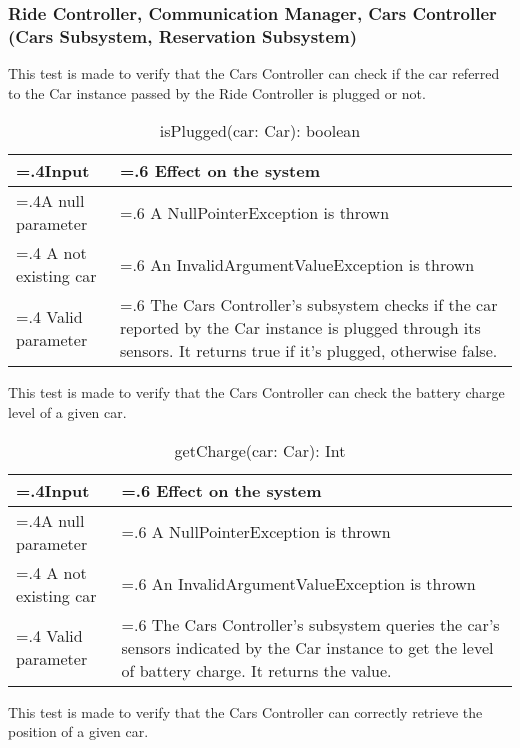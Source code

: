 \documentclass[10pt, a4paper,titlepage]{article}
\begin{document}
\subsubsection{Ride Controller, Communication Manager, Cars Controller (Cars Subsystem, Reservation Subsystem)}
This test is made to verify that the Cars Controller can check if the car referred to the Car instance passed by the Ride Controller is plugged or not.
\begin{table}[h]
\caption{isPlugged(car: Car): boolean}
\begin{tabularx}{\textwidth}{|>{\hsize=.4\hsize}X|>{\hsize=.6\hsize}X|}
\hline
Input & Effect on the system\\
\hline
A null parameter & A NullPointerException is thrown\\
\hline
A not existing car & An InvalidArgumentValueException is thrown\\
\hline
Valid parameter & The Cars Controller’s subsystem checks if the car reported by the Car instance is plugged through its sensors. It returns true if it’s plugged, otherwise false.\\
\hline
\end{tabularx}
\end{table}
\linebreak
This test is made to verify that the Cars Controller can check the battery charge level of a given car.
\begin{table}[h]
\caption{getCharge(car: Car): Int}
\begin{tabularx}{\textwidth}{|>{\hsize=.4\hsize}X|>{\hsize=.6\hsize}X|}
\hline
Input & Effect on the system\\
\hline
A null parameter & A NullPointerException is thrown\\
\hline
A not existing car & An InvalidArgumentValueException is thrown\\
\hline
Valid parameter & The Cars Controller’s subsystem queries the car’s sensors indicated by the Car instance  to get the level of battery charge. It returns the value.\\
\hline
\end{tabularx}
\end{table}
\linebreak
This test is made to verify that the Cars Controller can correctly retrieve the position of a given car.
\end{document}
